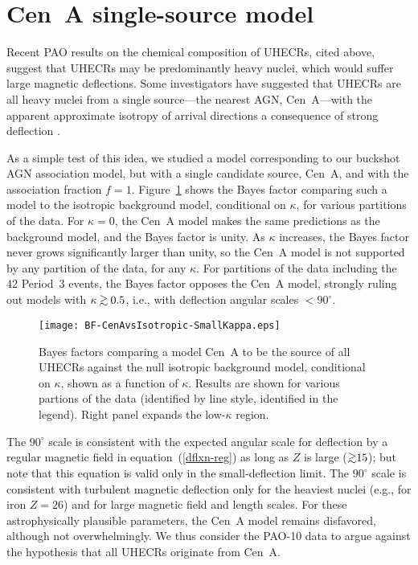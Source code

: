 \section{Cen~A single-source model}
\label{app:CenA}

Recent PAO results on the chemical composition of UHECRs, cited above,
suggest that UHECRs may be predominantly heavy nuclei, which would
suffer large magnetic deflections.  Some investigators have suggested
that UHECRs are all heavy nuclei from a single source---the nearest AGN,
Cen~A---with the apparent approximate isotropy of arrival directions
a consequence of strong deflection \cite{B+09-CenA,GBdS10-CenA,BdS12-CenA}.

As a simple test of this idea, we studied a model corresponding to our
buckshot AGN association model, but with a single candidate source, Cen~A, and
with the association fraction $f=1$.  Figure~\ref{fig:BF-CenA} shows the Bayes
factor comparing such a model to the isotropic background model, conditional
on $\kappa$, for various partitions of the data.  For $\kappa=0$, the Cen~A
model makes the same predictions as the background model, and the Bayes factor
is unity.  As $\kappa$ increases, the Bayes factor never grows significantly
larger than unity, so the Cen~A model is not supported by any partition of the
data, for any $\kappa$.  For partitions of the data including the 42 Period~3
events, the Bayes factor opposes the Cen~A model, strongly ruling out models
with $\kappa\simgreat 0.5$, i.e., with deflection angular scales $<90^\circ$.

\begin{figure}
\centerline{\texttt{[image: BF-CenAvsIsotropic-SmallKappa.eps]}}
\caption{Bayes factors comparing a model Cen~A to be the source of
all UHECRs against the null isotropic background model, conditional
on $\kappa$, shown as a function of $\kappa$.  Results are
shown for various partions of the data (identified by line style,
identified in the legend).  Right panel expands the low-$\kappa$ region.}
\label{fig:BF-CenA}
\end{figure}

The $90^\circ$ scale is consistent with the expected angular scale for
deflection by a regular magnetic field in equation~(\ref{dflxn-reg}) as long
as $Z$ is large ($\simgreat 15$); but note that this equation is valid only in
the small-deflection limit.  The $90^\circ$ scale is consistent with turbulent
magnetic deflection only for the heaviest nuclei (e.g., for iron $Z=26$) and
for large magnetic field and length scales.  For these astrophysically
plausible parameters, the Cen~A model remains disfavored, although not
overwhelmingly.  We thus consider the PAO-10 data to argue against the
hypothesis that all UHECRs originate from Cen~A.
